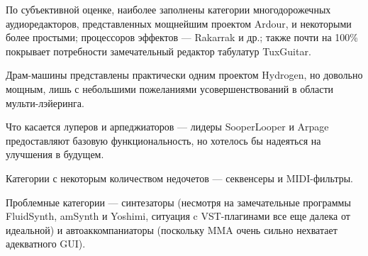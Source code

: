 \documentclass[10pt, a5paper]{article}
\begin{document}
По субъективной оценке, наиболее заполнены категории многодорожечных аудиоредакторов, представленных мощнейшим проектом Ardour, и некоторыми более простыми; процессоров эффектов --- Rakarrak и др.; также почти на 100\% покрывает потребности замечательный редактор табулатур TuxGuitar.

Драм-машины представлены практически одним проектом Hydrogen, но довольно мощным, лишь с небольшими пожеланиями усовершенствований в области мульти-лэйеринга.

Что касается луперов и арпеджиаторов --- лидеры SooperLooper и Arpage предоставляют базовую функциональность, но хотелось бы надеяться на улучшения в будущем.

Категории с некоторым количеством недочетов --- секвенсеры и MIDI-фильтры.

Проблемные категории --- синтезаторы (несмотря на замечательные программы FluidSynth, amSynth и Yoshimi, ситуация  c VST-плагинами все еще далека от идеальной) и автоаккомпаниаторы (поскольку MMA очень сильно нехватает адекватного GUI).
\end{document}
